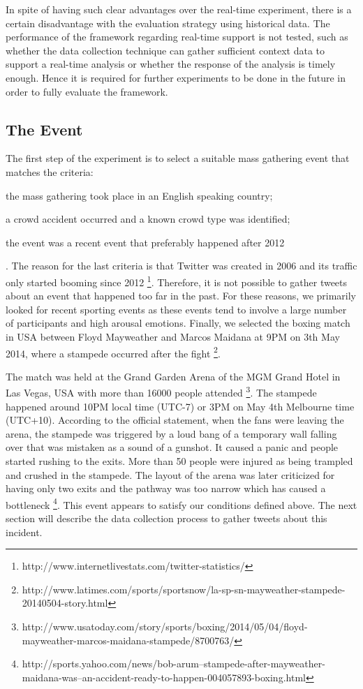 In spite of having such clear advantages over the real-time experiment, there is a certain disadvantage with the evaluation strategy using historical data. The performance of the framework regarding real-time support is not tested, such as whether the data collection technique can gather sufficient context data to support a real-time analysis or whether the response of the analysis is timely enough. Hence it is required for further experiments to be done in the future in order to fully evaluate the framework.

\subsection{The Event}
The first step of the experiment is to select a suitable mass gathering event that matches the criteria:
\begin{inparaenum}[i)]
\item the mass gathering took place in an English speaking country;
\item a crowd accident occurred and a known crowd type was identified;
\item the event was a recent event that preferably happened after 2012
\end{inparaenum}. The reason for the last criteria is that Twitter was created in 2006 and its traffic only started booming since 2012 \footnote{http://www.internetlivestats.com/twitter-statistics/}. Therefore, it is not possible to gather tweets about an event that happened too far in the past. For these reasons, we primarily looked for recent sporting events as these events tend to involve a large number of participants and high arousal emotions. Finally, we selected the boxing match in USA between Floyd Mayweather and Marcos Maidana at 9PM on 3th May 2014, where a stampede occurred after the fight \footnote{http://www.latimes.com/sports/sportsnow/la-sp-sn-mayweather-stampede-20140504-story.html}.

The match was held at the Grand Garden Arena of the MGM Grand Hotel in Las Vegas, USA with more than 16000 people attended \footnote{http://www.usatoday.com/story/sports/boxing/2014/05/04/floyd-mayweather-marcos-maidana-stampede/8700763/}. The stampede happened around 10PM local time (UTC-7) or 3PM on May 4th Melbourne time (UTC+10). According to the official statement, when the fans were leaving the arena, the stampede was triggered by a loud bang of a temporary wall falling over that was mistaken as a sound of a gunshot. It caused a panic and people started rushing to the exits. More than 50 people were injured as being trampled and crushed in the stampede. The layout of the arena was later criticized for having only two exits and the pathway was too narrow which has caused a bottleneck \footnote{http://sports.yahoo.com/news/bob-arum--stampede-after-mayweather-maidana-was--an-accident-ready-to-happen-004057893-boxing.html}. This event appears to satisfy our conditions defined above. The next section will describe the data collection process to gather tweets about this incident.

